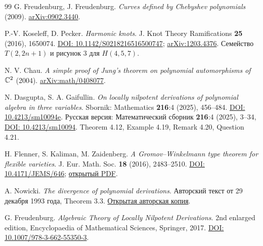 \begin{thebibliography}{99}
 G. Freudenburg, J. Freudenburg.
\emph{Curves defined by Chebyshev polynomials} (2009).
\href{https://arxiv.org/abs/0902.3440}{arXiv:0902.3440}.

 P.-V. Koseleff, D. Pecker.
\emph{Harmonic knots}.
J. Knot Theory Ramifications \textbf{25} (2016), 1650074.
\href{https://doi.org/10.1142/S0218216516500747}{DOI: 10.1142/S0218216516500747};
\href{https://arxiv.org/abs/1203.4376}{arXiv:1203.4376}.
Семейство $T(2,2n+1)$ и рисунок 3 для $H(4,5,7)$.

 N. V. Chau.
\emph{A simple proof of Jung's theorem on polynomial automorphisms
of ${\mathbb{C}}^2$} (2004).
\href{https://arxiv.org/abs/math/0408077}{arXiv:math/0408077}.

 N. Dasgupta, S. A. Gaifullin.
\emph{On locally nilpotent derivations of polynomial algebra in three
variables}. Sbornik: Mathematics \textbf{216}:4 (2025), 456--484.
\href{https://doi.org/10.4213/sm10094e}{DOI: 10.4213/sm10094e}.
Русская версия: Математический сборник \textbf{216}:4 (2025), 3--34,
\href{https://doi.org/10.4213/sm10094}{DOI: 10.4213/sm10094}.
Theorem 4.12, Example 4.19, Remark 4.20, Question 4.21.

 H. Flenner, S. Kaliman, M. Zaidenberg.
\emph{A Gromov--Winkelmann type theorem for flexible varieties}.
J. Eur. Math. Soc. \textbf{18} (2016), 2483--2510.
\href{https://doi.org/10.4171/JEMS/646}{DOI: 10.4171/JEMS/646};
\href{https://ems.press/content/serial-article-files/32154}{открытый PDF}.

 A. Nowicki.
\emph{The divergence of polynomial derivations}.
Авторский текст от 29 декабря 1993 года, Theorem 3.3.
\href{https://www.researchgate.net/publication/242147525_The_divergence_of_polynomial_derivations}{Открытая авторская копия}.

 G. Freudenburg.
\emph{Algebraic Theory of Locally Nilpotent Derivations}.
2nd enlarged edition, Encyclopaedia of Mathematical Sciences,
Springer, 2017.
\href{https://doi.org/10.1007/978-3-662-55350-3}{DOI: 10.1007/978-3-662-55350-3}.
\end{thebibliography}
